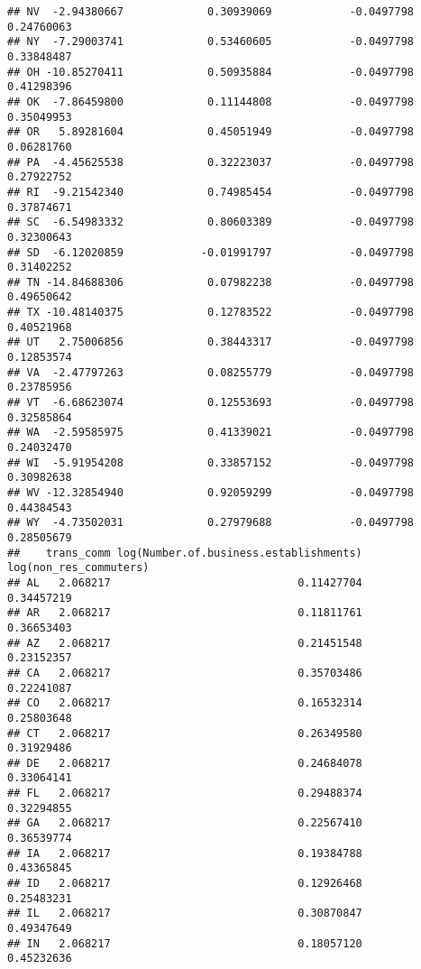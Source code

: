 \documentclass[
]{article}
\begin{document}
\begin{verbatim}
## NV  -2.94380667             0.30939069            -0.0497798         0.24760063
## NY  -7.29003741             0.53460605            -0.0497798         0.33848487
## OH -10.85270411             0.50935884            -0.0497798         0.41298396
## OK  -7.86459800             0.11144808            -0.0497798         0.35049953
## OR   5.89281604             0.45051949            -0.0497798         0.06281760
## PA  -4.45625538             0.32223037            -0.0497798         0.27922752
## RI  -9.21542340             0.74985454            -0.0497798         0.37874671
## SC  -6.54983332             0.80603389            -0.0497798         0.32300643
## SD  -6.12020859            -0.01991797            -0.0497798         0.31402252
## TN -14.84688306             0.07982238            -0.0497798         0.49650642
## TX -10.48140375             0.12783522            -0.0497798         0.40521968
## UT   2.75006856             0.38443317            -0.0497798         0.12853574
## VA  -2.47797263             0.08255779            -0.0497798         0.23785956
## VT  -6.68623074             0.12553693            -0.0497798         0.32585864
## WA  -2.59585975             0.41339021            -0.0497798         0.24032470
## WI  -5.91954208             0.33857152            -0.0497798         0.30982638
## WV -12.32854940             0.92059299            -0.0497798         0.44384543
## WY  -4.73502031             0.27979688            -0.0497798         0.28505679
##    trans_comm log(Number.of.business.establishments) log(non_res_commuters)
## AL   2.068217                             0.11427704             0.34457219
## AR   2.068217                             0.11811761             0.36653403
## AZ   2.068217                             0.21451548             0.23152357
## CA   2.068217                             0.35703486             0.22241087
## CO   2.068217                             0.16532314             0.25803648
## CT   2.068217                             0.26349580             0.31929486
## DE   2.068217                             0.24684078             0.33064141
## FL   2.068217                             0.29488374             0.32294855
## GA   2.068217                             0.22567410             0.36539774
## IA   2.068217                             0.19384788             0.43365845
## ID   2.068217                             0.12926468             0.25483231
## IL   2.068217                             0.30870847             0.49347649
## IN   2.068217                             0.18057120             0.45232636

\end{verbatim}
\end{document}
